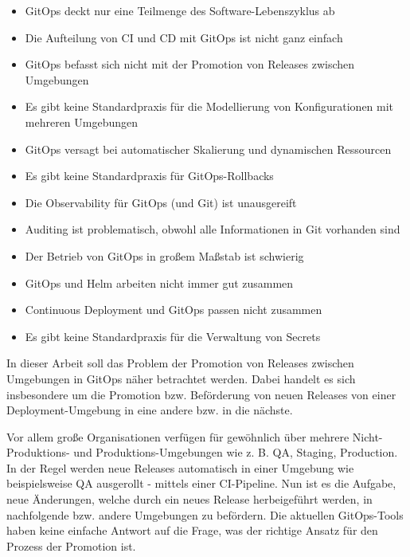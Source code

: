 \begin{itemize}
	\item GitOps deckt nur eine Teilmenge des Software-Lebenszyklus ab
	\item Die Aufteilung von CI und CD mit GitOps ist nicht ganz einfach
	\item GitOps befasst sich nicht mit der Promotion von Releases zwischen Umgebungen
	\item Es gibt keine Standardpraxis für die Modellierung von Konfigurationen mit mehreren Umgebungen
	\item GitOps versagt bei automatischer Skalierung und dynamischen Ressourcen
	\item Es gibt keine Standardpraxis für GitOps-Rollbacks
	\item Die Observability für GitOps (und Git) ist unausgereift
	\item Auditing ist problematisch, obwohl alle Informationen in Git vorhanden sind
	\item Der Betrieb von GitOps in großem Maßstab ist schwierig
	\item GitOps und Helm arbeiten nicht immer gut zusammen
	\item Continuous Deployment und GitOps passen nicht zusammen
	\item Es gibt keine Standardpraxis für die Verwaltung von Secrets
\end{itemize}

\autocite{codefreshGitopsPains10}
\bigskip




\noindent
In dieser Arbeit soll das Problem der
Promotion von Releases zwischen Umgebungen in GitOps
näher betrachtet werden.
Dabei handelt es sich insbesondere um
die Promotion bzw. Beförderung von neuen Releases
von einer Deployment-Umgebung in eine andere bzw. in die nächste.
\bigskip

\noindent
Vor allem große Organisationen verfügen für gewöhnlich über mehrere
Nicht-Produktions- und Produktions-Umgebungen
wie z. B. QA, Staging, Production.
In der Regel werden neue Releases automatisch in einer Umgebung
wie beispielsweise QA ausgerollt - mittels einer CI-Pipeline.
Nun ist es die Aufgabe,
neue Änderungen, welche durch ein neues Release herbeigeführt werden,
in nachfolgende bzw. andere Umgebungen zu befördern.
Die aktuellen GitOps-Tools haben keine einfache Antwort auf
die Frage, was der richtige Ansatz für den Prozess der Promotion ist.
\bigskip

